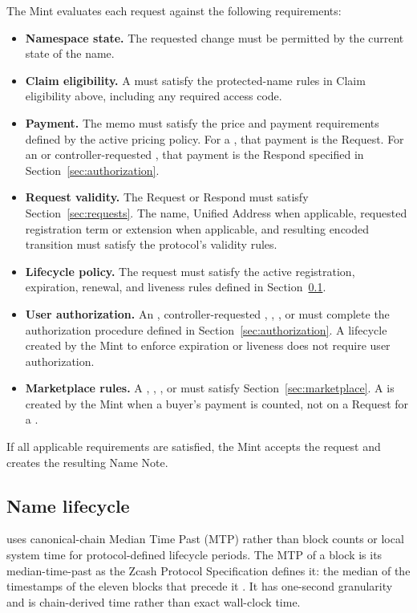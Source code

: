 The Mint evaluates each request against the following requirements:

\begin{itemize}
  \item \textbf{Namespace state.} The requested change must be permitted by the current state of the name.
  \item \textbf{Claim eligibility.} A  must satisfy the protected-name rules in Claim eligibility above, including any required access code.
  \item \textbf{Payment.} The memo must satisfy the price and payment requirements defined by the active pricing policy. For a , that payment is the Request. For an  or controller-requested , that payment is the Respond specified in Section~\ref{sec:authorization}.
  \item \textbf{Request validity.} The Request or Respond must satisfy Section~\ref{sec:requests}. The name, Unified Address when applicable, requested registration term or extension when applicable, and resulting encoded transition must satisfy the protocol's validity rules.
  \item \textbf{Lifecycle policy.} The request must satisfy the active registration, expiration, renewal, and liveness rules defined in Section~\ref{sec:the-mint-lifecycle}.
  \item \textbf{User authorization.} An , controller-requested , , , or  must complete the authorization procedure defined in Section~\ref{sec:authorization}. A lifecycle  created by the Mint to enforce expiration or liveness does not require user authorization.
  \item \textbf{Marketplace rules.} A , , , or  must satisfy Section~\ref{sec:marketplace}. A  is created by the Mint when a buyer's payment is counted, not on a Request for a .
\end{itemize}

If all applicable requirements are satisfied, the Mint accepts the request and creates the resulting Name Note.

\subsection{Name lifecycle}
\label{sec:the-mint-lifecycle}

\zns{} uses canonical-chain Median Time Past (MTP) rather than block counts or local system time for protocol-defined lifecycle periods. The MTP of a block is its median-time-past as the Zcash Protocol Specification defines it: the median of the timestamps of the eleven blocks that precede it \cite{zcash-protocol}. It has one-second granularity and is chain-derived time rather than exact wall-clock time.

